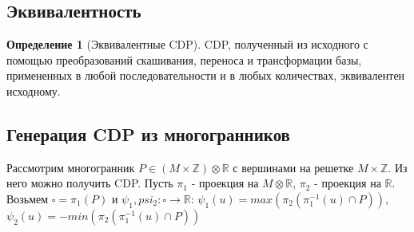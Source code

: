 \documentclass[16pt]{article}
\theoremstyle{definition}
\newtheorem{definition}{Определение}[section]
\begin{document}
\subsection{Эквивалентность}
\begin{definition}[Эквивалентные CDP]
CDP, полученный из исходного с помощью преобразований скашивания, переноса и трансформации базы, примененных в любой последовательности и в любых количествах, эквивалентен исходному.
\end{definition}

\subsection{Генерация CDP из многогранников}
Рассмотрим многогранник $P \in (M \times \mathds{Z}) \otimes \mathds{R}$ с вершинами на решетке $M \times \mathds{Z}$. Из него можно получить CDP. Пусть $\pi_1$ - проекция на $M \otimes \mathds{R}$, $\pi_2$ - проекция на $\mathds{R}$. Возьмем $\square = \pi_1(P)$ и $\psi_1, psi_2: \square \rightarrow \mathds{R}$: 
$ \psi_1(u) = max(\pi_2(\pi_1^{-1}(u) \cap P))$, $\psi_2(u) = -min(\pi_2(\pi_1^{-1}(u) \cap P))$
%
\end{document}
